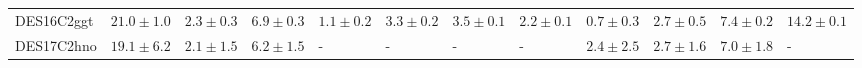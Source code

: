 \documentclass[fleqn,usenatbib,]{mnras}
\begin{document}
\begin{table}
\begin{tabular}{llllllllllll}
DES16C2ggt &   $21.0 \pm 1.0$ &    $2.3 \pm 0.3$ &     $6.9 \pm 0.3$ &   $1.1 \pm 0.2$ &   $3.3 \pm 0.2$ &   $3.5 \pm 0.1$ &   $2.2 \pm 0.1$ &   $0.7 \pm 0.3$ &    $2.7 \pm 0.5$ &    $7.4 \pm 0.2$ &   $14.2 \pm 0.1$ \\
DES17C2hno &   $19.1 \pm 6.2$ &    $2.1 \pm 1.5$ &     $6.2 \pm 1.5$ &               - &               - &               - &               - &   $2.4 \pm 2.5$ &    $2.7 \pm 1.6$ &    $7.0 \pm 1.8$ &                - \\
\bottomrule
\end{tabular}

\end{table}



\bsp	%
\label{lastpage}
\end{document}
